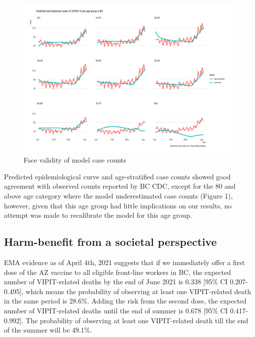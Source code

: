 \documentclass[]{interact}
\theoremstyle{plain}%
\theoremstyle{definition}
\theoremstyle{remark}
\begin{document}
\begin{figure}

{\centering \includegraphics[width=1\linewidth]{../figures/fig-validation} 

}

\caption{Face validity of model case counts}\label{fig:figValidation}
\end{figure}

Predicted epidemiological curve and age-stratified case counts showed
good agreement with observed counts reported by BC CDC, except for the
80 and above age category where the model underestimated case counts
(Figure 1), however, given that this age group had little implications
on our results, no attempt was made to recalibrate the model for this
age group.

\hypertarget{harm-benefit-from-a-societal-perspective}{%
\subsection{Harm-benefit from a societal
perspective}\label{harm-benefit-from-a-societal-perspective}}

EMA evidence as of April 4th, 2021 suggests that if we immediately offer
a first dose of the AZ vaccine to all eligible front-line workers in BC,
the expected number of VIPIT-related deaths by the end of June 2021 is
0.338 {[}95\% CI 0.207-0.495{]}, which means the probability of
observing at least one VIPIT-related death in the same period is 28.6\%.
Adding the risk from the second dose, the expected number of
VIPIT-related deaths until the end of summer is 0.678 {[}95\% CI
0.417-0.992{]}. The probability of observing at least one VIPIT-related
death till the end of the summer will be 49.1\%.
\end{document}

